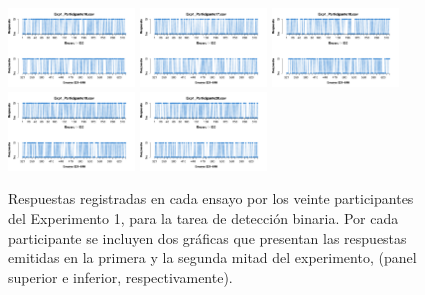 \begin{figure}[th]
\includegraphics[width=0.30\textwidth]{Figures/Response_Exp1_P16} \includegraphics[width=0.30\textwidth]{Figures/Response_Exp1_P17} \includegraphics[width=0.30\textwidth]{Figures/Response_Exp1_P18}
\includegraphics[width=0.30\textwidth]{Figures/Response_Exp1_P19} \includegraphics[width=0.30\textwidth]{Figures/Response_Exp1_P20} 
\caption[Respuesta binaria registrada ensayo a ensayo; Experimento 1]{Respuestas registradas en cada ensayo por los veinte participantes del Experimento 1, para la tarea de detección binaria. Por cada participante se incluyen dos gráficas que presentan las respuestas emitidas en la primera y la segunda mitad del experimento, (panel superior e inferior, respectivamente).}
\label{fig:Response_E1}
\end{figure}

